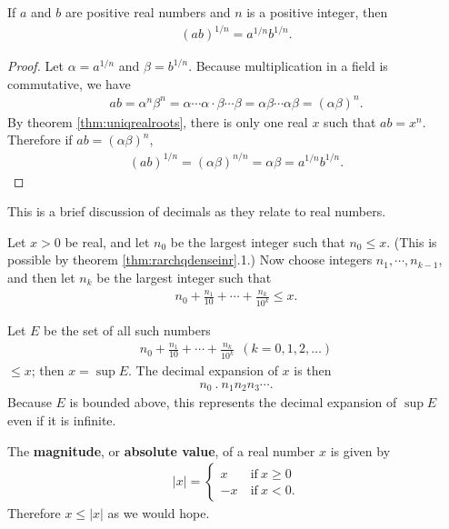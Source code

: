 \documentclass[12pt]{article}
\begin{document}
\begin{cor}
  If $a$ and $b$ are positive real numbers and $n$ is a positive integer, then
  \begin{align*}
    (ab)^{1/n} = a^{1/n}b^{1/n}.
  \end{align*}

  \begin{proof}
    Let $\alpha = a^{1/n}$ and $\beta = b^{1/n}$. Because multiplication in a field
    is commutative, we have
    \begin{align*}
      ab = \alpha^n\beta^n = \alpha \cdots \alpha \cdot \beta \cdots \beta =
      \alpha\beta \cdots \alpha\beta = (\alpha\beta)^n.
    \end{align*}
    By theorem \ref{thm:uniqrealroots}, there is only one real $x$ such that $ab =
    x^n$. Therefore if $ab = (\alpha\beta)^n$,
    \begin{align*}
      (ab)^{1/n} = (\alpha\beta)^{n/n} = \alpha\beta = a^{1/n}b^{1/n}.
    \end{align*}
  \end{proof}
\end{cor}

\begin{comm}
  This is a brief discussion of decimals as they relate to real numbers.

  Let $x > 0$ be real, and let $n_0$ be the largest integer such that $n_0 \leq x$.
  (This is possible by theorem \ref{thm:rarchqdenseinr}.1.) Now choose integers
  $n_1,\cdots,n_{k-1}$, and then let $n_k$ be the largest integer such that
  \begin{align*}
    n_0 + \frac{n_1}{10} + \cdots + \frac{n_k}{10^k} \leq x.
  \end{align*}

  Let $E$ be the set of all such numbers
  \begin{align*}
    n_0 + \frac{n_1}{10} + \cdots + \frac{n_k}{10^k}\ \ (k = 0,1,2,\ldots)
  \end{align*}
  $\leq x$; then $x = \sup E$. The decimal expansion of $x$ is then
  \begin{align*}
    n_0\ .\ n_1n_2n_3\cdots.
  \end{align*}
  Because $E$ is bounded above, this represents the decimal expansion of $\sup E$
  even if it is infinite.
\end{comm}

\begin{defn}
  The \textbf{magnitude}, or \textbf{absolute value}, of a real number $x$ is given
  by
  \begin{align*}
    |x| =
    \begin{cases}
      x\ &\text{if}\ x \geq 0\\
      -x\ &\text{if}\ x < 0.
    \end{cases}
  \end{align*}
  Therefore $x \leq |x|$ as we would hope.
\end{defn}
\end{document}
